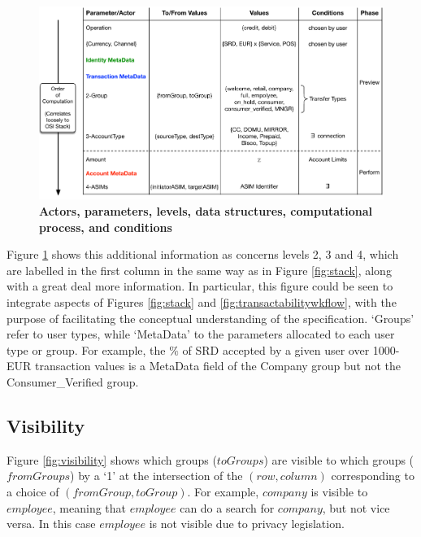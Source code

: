 \begin{figure}[htbp]
\centering
\includegraphics[width=17cm]{Figures/Vocabulary}
\caption{\small\textbf{Actors, parameters, levels, data structures, computational process, and conditions}}
\label{fig:vocabulary}
\end{figure}

Figure \ref{fig:vocabulary} shows this additional information as concerns levels 2, 3 and 4, which are labelled in the first column in the same way as in Figure \ref{fig:stack}, along with a great deal more information. In particular, this figure could be seen to integrate aspects of Figures \ref{fig:stack} and \ref{fig:transactabilitywkflow}, with the purpose of facilitating the conceptual understanding of the specification. `Groups' refer to user types, while `MetaData' to the parameters allocated to each user type or group. For example, the $\%$ of SRD accepted by a given user over 1000-EUR transaction values is a MetaData field of the Company group but not the Consumer\_Verified group.

\subsection{Visibility}
Figure \ref{fig:visibility} shows which groups ($toGroups$) are visible to which groups ($fromGroups$) by a `1' at the intersection of the $(row, column)$ corresponding to a choice of $(fromGroup, toGroup)$. For example, $company$ is visible to $employee$, meaning that $employee$ can do a search for $company$, but not vice versa. In this case $employee$ is not visible due to privacy legislation.

